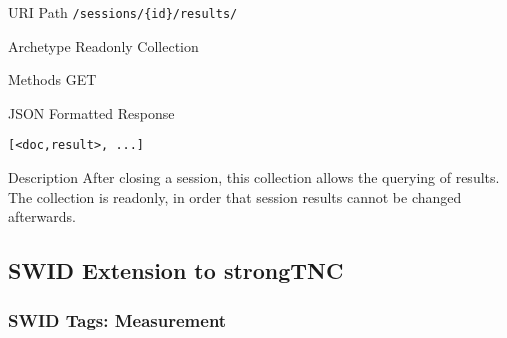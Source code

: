 \documentclass[10pt,a4paper]{scrartcl}
\begin{document}
\begin{mdframed}[style=def]
\begin{description*}
	\item[URI Path] \texttt{/sessions/\{id\}/results/}
	\item[Archetype] Readonly Collection
	\item[Methods] GET
	\item[JSON Formatted Response] \hfill
\begin{lstlisting}
[<doc,result>, ...]
\end{lstlisting}
	\item[Description] After closing a session, this collection allows the
		querying of results. The collection is readonly, in order that session results
		cannot be changed afterwards.
\end{description*}
\end{mdframed}


\pagebreak


\subsection{SWID Extension to strongTNC}

\subsubsection{SWID Tags: Measurement}
\end{document}
